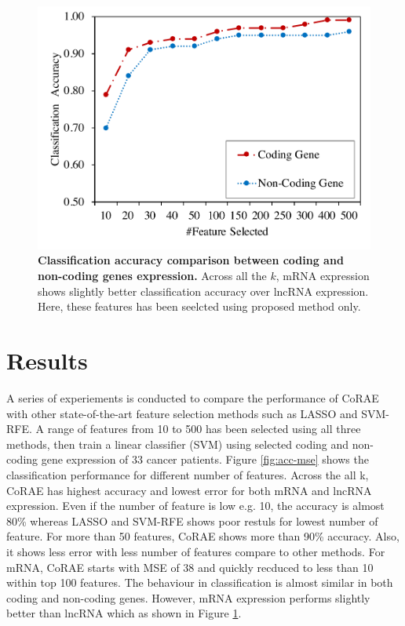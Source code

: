 \documentclass{bioinfo}
\begin{document}
{\begin{figure}[hbt]
    \centering
    \includegraphics[scale=0.45]{fig/acc-mRNA-lncRNA.pdf}
    \caption{\textbf{Classification accuracy comparison between coding and non-coding genes expression.} Across all the $k$, mRNA expression shows slightly better classification accuracy over lncRNA expression. Here, these features has been seelcted using proposed method only.}
    \label{fig:acc-mRNA-lncRNA}
\end{figure}
\section{Results}
A series of experiements is conducted to compare the performance of CoRAE with other state-of-the-art feature selection methods such as LASSO and SVM-RFE. A range of features from 10 to 500 has been selected using all three methods, then train a linear classifier (SVM) using selected coding and non-coding gene expression of 33 cancer patients. Figure \ref{fig:acc-mse} shows the classification performance for different number of features. Across the all k, CoRAE has highest accuracy and lowest error for both mRNA and lncRNA expression. Even if the number of feature is low e.g. 10, the accuracy is almost 80\% whereas LASSO and SVM-RFE shows poor restuls for lowest number of feature. For more than 50 features, CoRAE shows more than 90\% accuracy. Also, it shows less error with less number of features compare to other methods. 
For mRNA, CoRAE starts with MSE of 38 and quickly recduced to less than 10 within top 100 features. 
The behaviour in classification is almost similar in both coding and non-coding genes. However, mRNA expression performs slightly better than lncRNA which as shown in Figure  \ref{fig:acc-mRNA-lncRNA}.

}
\end{document}
